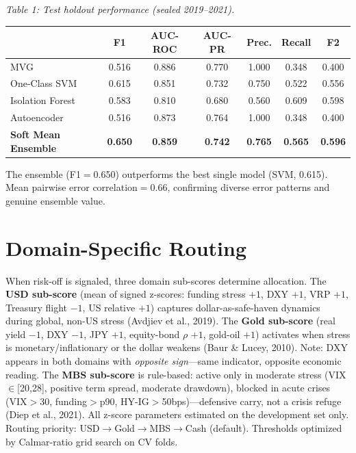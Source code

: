 \documentclass[10pt, a4paper]{article}
\begin{document}
\vspace{2pt}
\begin{center}
\small
\textit{Table 1: Test holdout performance (sealed 2019--2021).}\\[4pt]
\begin{tabular}{lcccccc}
\toprule
& \textbf{F1} & \textbf{AUC-ROC} & \textbf{AUC-PR} & \textbf{Prec.} & \textbf{Recall} & \textbf{F2}\\
\midrule
MVG & 0.516 & 0.886 & 0.770 & 1.000 & 0.348 & 0.400\\
One-Class SVM & 0.615 & 0.851 & 0.732 & 0.750 & 0.522 & 0.556\\
Isolation Forest & 0.583 & 0.810 & 0.680 & 0.560 & 0.609 & 0.598\\
Autoencoder & 0.516 & 0.873 & 0.764 & 1.000 & 0.348 & 0.400\\
\midrule
\textbf{Soft Mean Ensemble} & \textbf{0.650} & \textbf{0.859} & \textbf{0.742} & \textbf{0.765} & \textbf{0.565} & \textbf{0.596}\\
\bottomrule
\end{tabular}
\end{center}
\vspace{2pt}

The ensemble (F1$=$0.650) outperforms the best single model (SVM, 0.615). Mean pairwise error correlation$=$0.66, confirming diverse error patterns and genuine ensemble value.

\section{Domain-Specific Routing}

When risk-off is signaled, three domain sub-scores determine allocation. The \textbf{USD sub-score} (mean of signed z-scores: funding stress $+1$, DXY $+1$, VRP $+1$, Treasury flight $-1$, US relative $+1$) captures dollar-as-safe-haven dynamics during global, non-US stress (Avdjiev et al., 2019). The \textbf{Gold sub-score} (real yield $-1$, DXY $-1$, JPY $+1$, equity-bond $\rho$ $+1$, gold-oil $+1$) activates when stress is monetary/inflationary or the dollar weakens (Baur \& Lucey, 2010). Note: DXY appears in both domains with \textit{opposite sign}---same indicator, opposite economic reading. The \textbf{MBS sub-score} is rule-based: active only in moderate stress (VIX$\in$[20,28], positive term spread, moderate drawdown), blocked in acute crises (VIX$>$30, funding$>$p90, HY-IG$>$50bps)---defensive carry, not a crisis refuge (Diep et al., 2021). All z-score parameters estimated on the development set only. Routing priority: USD$\to$Gold$\to$MBS$\to$Cash (default). Thresholds optimized by Calmar-ratio grid search on CV folds.
\end{document}
